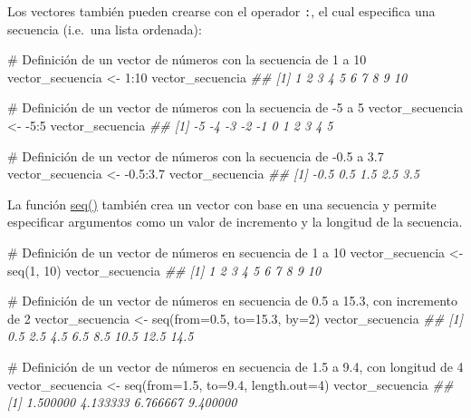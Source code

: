 \documentclass[
  letterpaper,
  DIV=11,
  numbers=noendperiod]{scrreprt}
\newenvironment{Shaded}{\begin{snugshade}}{\end{snugshade}}
\newcommand{\AttributeTok}[1]{\textcolor[rgb]{0.40,0.45,0.13}{#1}}
\newcommand{\CommentTok}[1]{\textcolor[rgb]{0.37,0.37,0.37}{#1}}
\newcommand{\DecValTok}[1]{\textcolor[rgb]{0.68,0.00,0.00}{#1}}
\newcommand{\DocumentationTok}[1]{\textcolor[rgb]{0.37,0.37,0.37}{\textit{#1}}}
\newcommand{\FloatTok}[1]{\textcolor[rgb]{0.68,0.00,0.00}{#1}}
\newcommand{\FunctionTok}[1]{\textcolor[rgb]{0.28,0.35,0.67}{#1}}
\newcommand{\NormalTok}[1]{\textcolor[rgb]{0.00,0.23,0.31}{#1}}
\newcommand{\OtherTok}[1]{\textcolor[rgb]{0.00,0.23,0.31}{#1}}
\newcommand{\SpecialCharTok}[1]{\textcolor[rgb]{0.37,0.37,0.37}{#1}}
\begin{document}
Los vectores también pueden crearse con el operador \texttt{:}, el cual
especifica una secuencia (i.e.~una lista ordenada):

\begin{Shaded}
\begin{Highlighting}[]
\CommentTok{\# Definición de un vector de números con la secuencia de 1 a 10}
\NormalTok{vector\_secuencia }\OtherTok{\textless{}{-}} \DecValTok{1}\SpecialCharTok{:}\DecValTok{10}
\NormalTok{vector\_secuencia}
\DocumentationTok{\#\#  [1]  1  2  3  4  5  6  7  8  9 10}

\CommentTok{\# Definición de un vector de números con la secuencia de {-}5 a 5}
\NormalTok{vector\_secuencia }\OtherTok{\textless{}{-}} \SpecialCharTok{{-}}\DecValTok{5}\SpecialCharTok{:}\DecValTok{5}
\NormalTok{vector\_secuencia}
\DocumentationTok{\#\#  [1] {-}5 {-}4 {-}3 {-}2 {-}1  0  1  2  3  4  5}

\CommentTok{\# Definición de un vector de números con la secuencia de {-}0.5 a 3.7}
\NormalTok{vector\_secuencia }\OtherTok{\textless{}{-}} \SpecialCharTok{{-}}\FloatTok{0.5}\SpecialCharTok{:}\FloatTok{3.7}
\NormalTok{vector\_secuencia}
\DocumentationTok{\#\# [1] {-}0.5  0.5  1.5  2.5  3.5}
\end{Highlighting}
\end{Shaded}

La función \href{https://rdrr.io/r/base/seq.html}{seq()} también crea un
vector con base en una secuencia y permite especificar argumentos como
un valor de incremento y la longitud de la secuencia.

\begin{Shaded}
\begin{Highlighting}[]
\CommentTok{\# Definición de un vector de números en secuencia de 1 a 10}
\NormalTok{vector\_secuencia }\OtherTok{\textless{}{-}} \FunctionTok{seq}\NormalTok{(}\DecValTok{1}\NormalTok{, }\DecValTok{10}\NormalTok{)}
\NormalTok{vector\_secuencia}
\DocumentationTok{\#\#  [1]  1  2  3  4  5  6  7  8  9 10}

\CommentTok{\# Definición de un vector de números en secuencia de 0.5 a 15.3, con incremento de 2}
\NormalTok{vector\_secuencia }\OtherTok{\textless{}{-}} \FunctionTok{seq}\NormalTok{(}\AttributeTok{from=}\FloatTok{0.5}\NormalTok{, }\AttributeTok{to=}\FloatTok{15.3}\NormalTok{, }\AttributeTok{by=}\DecValTok{2}\NormalTok{)}
\NormalTok{vector\_secuencia}
\DocumentationTok{\#\# [1]  0.5  2.5  4.5  6.5  8.5 10.5 12.5 14.5}

\CommentTok{\# Definición de un vector de números en secuencia de 1.5 a 9.4, con longitud de 4}
\NormalTok{vector\_secuencia }\OtherTok{\textless{}{-}} \FunctionTok{seq}\NormalTok{(}\AttributeTok{from=}\FloatTok{1.5}\NormalTok{, }\AttributeTok{to=}\FloatTok{9.4}\NormalTok{, }\AttributeTok{length.out=}\DecValTok{4}\NormalTok{)}
\NormalTok{vector\_secuencia}
\DocumentationTok{\#\# [1] 1.500000 4.133333 6.766667 9.400000}
\end{Highlighting}
\end{Shaded}
\end{document}
